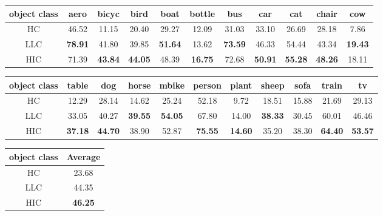 \documentclass[a4paper,12pt]{article}
\begin{document}
\begin{center}
\begin{table*}[!t]
	\caption{Image classification results on PASCAL VOC 2012 validation set}
	\label{tbl:results}
	\vskip 0.2cm
	\begin{subtable}
			\centering
			\begin{tabular}{c||c|c|c|c|c|c|c|c|c|c}
				\hline 
				object class & aero & bicyc & bird & boat & bottle & bus & car & cat & chair & cow \\
				\hline \hline
				HC  & 46.52 & 11.15 & 20.40 & 29.27 & 12.09 & 31.03 & 33.10 & 26.69 & 28.18 & 7.86 \\
				\hline
				LLC  & \textbf{78.91} & 41.80 & 39.85 & \textbf{51.64} & 13.62 & \textbf{73.59} & 46.33 & 54.44 & 43.34 & \textbf{19.43} \\
				\hline
				HIC  & 71.39 & \textbf{43.84} & \textbf{44.05}  & 48.39 & \textbf{16.75} & 72.68 & \textbf{50.91} & \textbf{55.28} & \textbf{48.26} & 18.11 \\
				\hline
			\end{tabular}
	\end{subtable}
		\vskip 0.2cm
	\begin{subtable}
			\centering
			\begin{tabular}{c||c|c|c|c|c|c|c|c|c|c}
				\hline 
				object class & table & dog & horse & mbike & person & plant & sheep & sofa & train & tv \\
				\hline \hline
				HC  & 12.29 & 28.14 & 14.62  & 25.24 & 52.18 & 9.72 & 18.51 & 15.88 & 21.69 & 29.13 \\
				\hline
				LLC  & 33.05 & 40.27 & \textbf{39.55}  & \textbf{54.05} & 67.80 & 14.00 & \textbf{38.33} & 30.45 & 60.01 & 46.46 \\
				\hline
				HIC  & \textbf{37.18} & \textbf{44.70} & 38.90  & 52.87 & \textbf{75.55} & \textbf{14.60} & 35.20 & 38.30 & \textbf{64.40} & \textbf{53.57} \\
				\hline
			\end{tabular}
	\end{subtable}
	\vskip 0.2cm
	\begin{subtable}
			\centering
			\begin{tabular}{c||c}
				\hline 
				object class & Average \\
				\hline \hline
				HC  & 23.68  \\
				\hline
				LLC  & 44.35  \\
				\hline
				HIC  & \textbf{46.25}  \\
				\hline
			\end{tabular}
	\end{subtable}
\end{table*}
\end{center}
\end{document}
